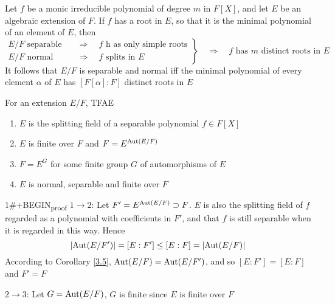 \documentclass[11pt]{article}
\begin{document}
Let \(f\) be a monic irreducible polynomial of degree \(m\) in \(F[X]\), and let \(E\) be an
algebraic extension of \(F\). If \(f\) has a root in \(E\), so that it is the minimal polynomial
of an element of \(E\), then
\begin{equation*}
\left.
\begin{aligned}
E/F\text{ separable}&\quad\Rightarrow\quad f\text{ h  as only simple roots}\\
E/F\text{ normal}&\quad\Rightarrow\quad f\text{ splits in }E
\end{aligned}
\right\}\quad\Rightarrow\quad f\text{ has $m$ distinct roots in }E
\end{equation*}
It follows that \(E/F\) is separable and normal iff the minimal polynomial of every element
\(\alpha\) of \(E\) has \([F[\alpha]:F]\) distinct roots in \(E\)

\begin{theorem}[]
\label{3.9}
For an extension \(E/F\), TFAE
\begin{enumerate}
\item \(E\) is the splitting field of a separable polynomial \(f\in F[X]\)
\item \(E\) is finite over \(F\) and \(F=E^{\operatorname{\text{Aut}}(E/F)}\)
\item \(F=E^G\) for some finite group \(G\) of automorphisms of \(E\)
\item \(E\) is normal, separable and finite over \(F\)
\end{enumerate}
\end{theorem}

1\#+BEGIN\textsubscript{proof}
\(1\to 2\): Let \(F'=E^{\operatorname{\text{Aut}}(E/F)}\supset F\). \(E\) is also the splitting field of \(f\) regarded as a
polynomial with coefficients in \(F'\), and that \(f\) is still separable when it is regarded in
this way. Hence
\begin{equation*}
\abs{\Aut(E/F')}=[E:F']\le[E:F]=\abs{\Aut(E/F)}
\end{equation*}
According to Corollary \ref{3.5}, \(\operatorname{\text{Aut}}(E/F)=\operatorname{\text{Aut}}(E/F')\), and so \([E:F']=[E:F]\) and \(F'=F\)

\(2\to 3\): Let \(G=\operatorname{\text{Aut}}(E/F)\), \(G\) is finite since \(E\) is finite over \(F\)
\end{document}
